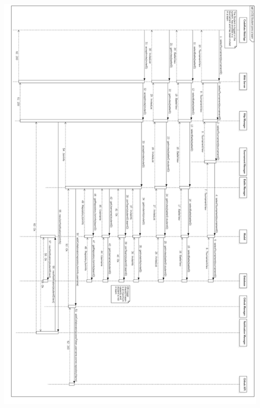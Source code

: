 \documentclass{article}
\begin{document}
\newpage
\begin{center}
    \includegraphics[angle=90,width=0.8\linewidth]{uc8.jpg}
  \label{fig:uc8}
\end{center}
\end{document}
